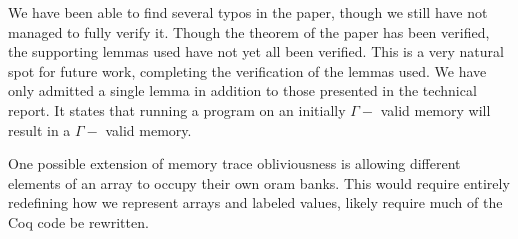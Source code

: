 \documentclass[10pt,  onecolumn]{article}
\begin{document}
We have been able to find several typos in the paper, though we still have not managed to fully verify it. 
Though the theorem of the paper has been verified, the supporting lemmas used have not yet all been verified. 
This is a very natural spot for future work, completing the verification of the lemmas used. 
We have only admitted a single lemma in addition to those presented in the technical report. 
It states that running a program on an initially $\Gamma-$ valid memory will result in a  $\Gamma-$ valid memory.%

One possible extension of memory trace obliviousness is allowing different elements of an array to occupy their own oram banks. 
This would require entirely redefining how we represent arrays and labeled values, likely require much of the Coq code be rewritten.






%
%
\cite{sf}
\cite{mtope}
\cite{techreport}
\cite{strongind}






\end{document}
